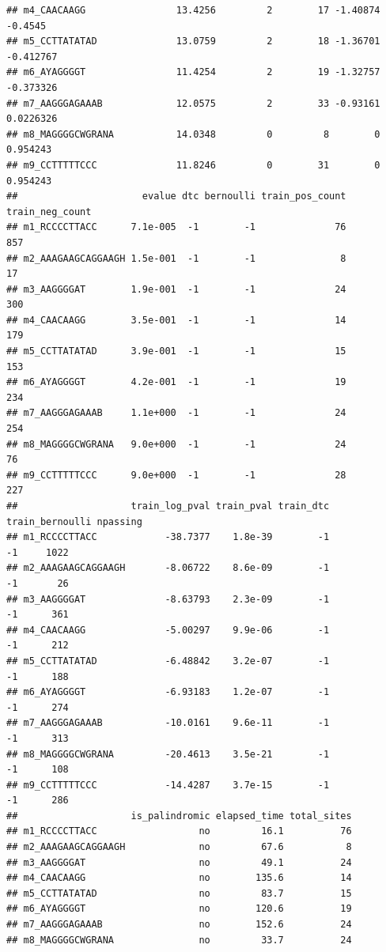 \documentclass[
]{book}
\begin{document}
\begin{verbatim}
## m4_CAACAAGG                13.4256         2        17 -1.40874    -0.4545
## m5_CCTTATATAD              13.0759         2        18 -1.36701  -0.412767
## m6_AYAGGGGT                11.4254         2        19 -1.32757  -0.373326
## m7_AAGGGAGAAAB             12.0575         2        33 -0.93161  0.0226326
## m8_MAGGGGCWGRANA           14.0348         0         8        0   0.954243
## m9_CCTTTTTCCC              11.8246         0        31        0   0.954243
##                      evalue dtc bernoulli train_pos_count train_neg_count
## m1_RCCCCTTACC      7.1e-005  -1        -1              76             857
## m2_AAAGAAGCAGGAAGH 1.5e-001  -1        -1               8              17
## m3_AAGGGGAT        1.9e-001  -1        -1              24             300
## m4_CAACAAGG        3.5e-001  -1        -1              14             179
## m5_CCTTATATAD      3.9e-001  -1        -1              15             153
## m6_AYAGGGGT        4.2e-001  -1        -1              19             234
## m7_AAGGGAGAAAB     1.1e+000  -1        -1              24             254
## m8_MAGGGGCWGRANA   9.0e+000  -1        -1              24              76
## m9_CCTTTTTCCC      9.0e+000  -1        -1              28             227
##                    train_log_pval train_pval train_dtc train_bernoulli npassing
## m1_RCCCCTTACC            -38.7377    1.8e-39        -1              -1     1022
## m2_AAAGAAGCAGGAAGH       -8.06722    8.6e-09        -1              -1       26
## m3_AAGGGGAT              -8.63793    2.3e-09        -1              -1      361
## m4_CAACAAGG              -5.00297    9.9e-06        -1              -1      212
## m5_CCTTATATAD            -6.48842    3.2e-07        -1              -1      188
## m6_AYAGGGGT              -6.93183    1.2e-07        -1              -1      274
## m7_AAGGGAGAAAB           -10.0161    9.6e-11        -1              -1      313
## m8_MAGGGGCWGRANA         -20.4613    3.5e-21        -1              -1      108
## m9_CCTTTTTCCC            -14.4287    3.7e-15        -1              -1      286
##                    is_palindromic elapsed_time total_sites
## m1_RCCCCTTACC                  no         16.1          76
## m2_AAAGAAGCAGGAAGH             no         67.6           8
## m3_AAGGGGAT                    no         49.1          24
## m4_CAACAAGG                    no        135.6          14
## m5_CCTTATATAD                  no         83.7          15
## m6_AYAGGGGT                    no        120.6          19
## m7_AAGGGAGAAAB                 no        152.6          24
## m8_MAGGGGCWGRANA               no         33.7          24

\end{verbatim}
\end{document}
